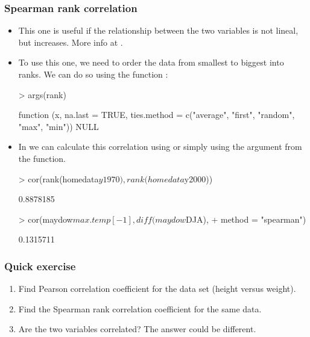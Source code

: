 \begin{frame}
  \frametitle{Spearman rank correlation}
  \begin{itemize}
  \item This one is useful if the relationship between the two variables is not lineal, but increases. More info at .
  \item To use this one, we need to order the data from smallest to biggest into ranks. We can do so using the function : \scriptsize
\begin{Schunk}
\begin{Sinput}
> args(rank)
\end{Sinput}
\begin{Soutput}
function (x, na.last = TRUE, ties.method = c("average", "first", 
    "random", "max", "min")) 
NULL
\end{Soutput}
\end{Schunk}
  \item \normalsize In  we can calculate this correlation using  or simply using the argument  from the  function.
\begin{Schunk}
\begin{Sinput}
> cor(rank(homedata$y1970), rank(homedata$y2000))
\end{Sinput}
\begin{Soutput}
[1] 0.8878185
\end{Soutput}
\begin{Sinput}
> cor(maydow$max.temp[-1], diff(maydow$DJA), 
+     method = "spearman")
\end{Sinput}
\begin{Soutput}
[1] 0.1315711
\end{Soutput}
\end{Schunk}
  \end{itemize}
\end{frame}  

\begin{frame}
  \frametitle{Quick exercise}
  \begin{enumerate}
  \item Find Pearson correlation coefficient for the  data set (height versus weight).
  \item Find the Spearman rank correlation coefficient for the same data.
  \item Are the two variables correlated? The answer could be different.
  \end{enumerate}
\end{frame}

